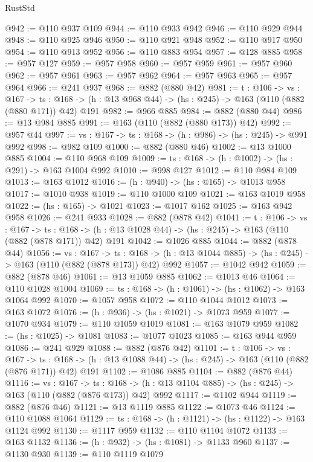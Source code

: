 \begin{lexlean}{RustStd}
\begin{coremodule}
@942 := @110 @937 @109
@944 := @110 @933 @942
@946 := @110 @929 @944
@948 := @110 @925 @946
@950 := @110 @921 @948
@952 := @110 @917 @950
@954 := @110 @913 @952
@956 := @110 @883 @954
@957 := @128 @885
@958 := @957 @127
@959 := @957 @958
@960 := @957 @959
@961 := @957 @960
@962 := @957 @961
@963 := @957 @962
@964 := @957 @963
@965 := @957 @964
@966 := @241 @937
@968 := @882 (@880 @42)
@981 := {t : @106} ->
  {vs : @167} ->
  {ts : @168} -> (h : @13 @968 @44) -> (hs : @245) -> @163 (@110 (@882 (@880 @171)) @42) @191
@982 := @966 @885
@984 := @882 (@880 @44)
@986 := @13 @984 @885
@991 := @163 (@110 (@882 (@880 @173)) @42)
@992 := @957 @44
@997 := {vs : @167} -> {ts : @168} -> (h : @986) -> (hs : @245) -> @991 @992
@998 := @982 @109
@1000 := @882 (@880 @46)
@1002 := @13 @1000 @885
@1004 := @110 @968 @109
@1009 := {ts : @168} -> (h : @1002) -> (hs : @291) -> @163 @1004 @992
@1010 := @998 @127
@1012 := @110 @984 @109
@1013 := @163 @1012
@1016 := (h : @940) -> (hs : @165) -> @1013 @958
@1017 := @1010 @938
@1019 := @110 @1000 @109
@1021 := @163 @1019 @958
@1022 := (hs : @165) -> @1021
@1023 := @1017 @162
@1025 := @163 @942 @958
@1026 := @241 @933
@1028 := @882 (@878 @42)
@1041 := {t : @106} ->
  {vs : @167} ->
  {ts : @168} -> (h : @13 @1028 @44) -> (hs : @245) -> @163 (@110 (@882 (@878 @171)) @42) @191
@1042 := @1026 @885
@1044 := @882 (@878 @44)
@1056 := {vs : @167} ->
  {ts : @168} -> (h : @13 @1044 @885) -> (hs : @245) -> @163 (@110 (@882 (@878 @173)) @42) @992
@1057 := @1042 @942
@1059 := @882 (@878 @46)
@1061 := @13 @1059 @885
@1062 := @1013 @46
@1064 := @110 @1028 @1004
@1069 := {ts : @168} -> (h : @1061) -> (hs : @1062) -> @163 @1064 @992
@1070 := @1057 @958
@1072 := @110 @1044 @1012
@1073 := @163 @1072
@1076 := (h : @936) -> (hs : @1021) -> @1073 @959
@1077 := @1070 @934
@1079 := @110 @1059 @1019
@1081 := @163 @1079 @959
@1082 := (hs : @1025) -> @1081
@1083 := @1077 @1023
@1085 := @163 @944 @959
@1086 := @241 @929
@1088 := @882 (@876 @42)
@1101 := {t : @106} ->
  {vs : @167} ->
  {ts : @168} -> (h : @13 @1088 @44) -> (hs : @245) -> @163 (@110 (@882 (@876 @171)) @42) @191
@1102 := @1086 @885
@1104 := @882 (@876 @44)
@1116 := {vs : @167} ->
  {ts : @168} -> (h : @13 @1104 @885) -> (hs : @245) -> @163 (@110 (@882 (@876 @173)) @42) @992
@1117 := @1102 @944
@1119 := @882 (@876 @46)
@1121 := @13 @1119 @885
@1122 := @1073 @46
@1124 := @110 @1088 @1064
@1129 := {ts : @168} -> (h : @1121) -> (hs : @1122) -> @163 @1124 @992
@1130 := @1117 @959
@1132 := @110 @1104 @1072
@1133 := @163 @1132
@1136 := (h : @932) -> (hs : @1081) -> @1133 @960
@1137 := @1130 @930
@1139 := @110 @1119 @1079

\end{coremodule}
\end{lexlean}

